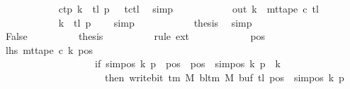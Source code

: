 \begin{isabellebody}
\ \ \ \ \ \ \ \ \ \ \isamarkupfalse%
\ c{}{\isacharunderscore}{\kern0pt}tp\ {\isacartoucheopen}k\ {\isacharequal}{\kern0pt}\ {\isacharquery}{\kern0pt}tl{\isacartoucheclose}\ {\isacartoucheopen}{\isacharquery}{\kern0pt}p\ {\isacharequal}{\kern0pt}\ {}{\isacartoucheclose}\ tc{\isacharunderscore}{\kern0pt}tl\ \isamarkupfalse%
\ simp\isanewline
\ \ \ \ \ \ \ \ \isamarkupfalse%
\ \isamarkupfalse%
\ {\isachardoublequoteopen}{\isacharquery}{\kern0pt}out\ k\ {\isacharequal}{\kern0pt}\ mt{\isacharunderscore}{\kern0pt}tape\ c{}\ {\isacharquery}{\kern0pt}tl{\isachardoublequoteclose}\isanewline
\ \ \ \ \ \ \ \ \ \ \isamarkupfalse%
\ {\isacartoucheopen}k\ {\isacharequal}{\kern0pt}\ {\isacharquery}{\kern0pt}tl{\isacartoucheclose}\ {\isacartoucheopen}{\isacharquery}{\kern0pt}p\ {\isacharequal}{\kern0pt}\ {}{\isacartoucheclose}\ \isamarkupfalse%
\ simp\isanewline
\ \ \ \ \ \ \ \ \isamarkupfalse%
\ \isamarkupfalse%
\ {\isacharquery}{\kern0pt}thesis\ \isamarkupfalse%
\ simp\isanewline
\ \ \ \ \ \ \isamarkupfalse%
\isanewline
\ \ \ \ \ \ \ \ \isamarkupfalse%
\ False\isanewline
\ \ \ \ \ \ \ \ \isamarkupfalse%
\ {\isacharquery}{\kern0pt}thesis\isanewline
\ \ \ \ \ \ \ \ \isamarkupfalse%
\ {\isacharparenleft}{\kern0pt}rule\ ext{\isacharparenright}{\kern0pt}\isanewline
\ \ \ \ \ \ \ \ \ \ \isamarkupfalse%
\ pos\isanewline
\ \ \ \ \ \ \ \ \ \ \isamarkupfalse%
\ lhs{\isacharcolon}{\kern0pt}\ {\isachardoublequoteopen}mt{\isacharunderscore}{\kern0pt}tape\ c{}\ k\ pos\isanewline
\ \ \ \ \ \ \ \ \ \ \ \ \ \ \ \ \ \ {\isacharequal}{\kern0pt}\ {\isacharparenleft}{\kern0pt}if\ sim{\isacharunderscore}{\kern0pt}pos\ {\isacharquery}{\kern0pt}k\ {\isacharquery}{\kern0pt}p\ {\isasymle}\ pos\ {\isasymand}\ pos\ {\isacharless}{\kern0pt}\ sim{\isacharunderscore}{\kern0pt}pos\ {\isacharquery}{\kern0pt}k\ {\isacharquery}{\kern0pt}p\ {\isacharplus}{\kern0pt}\ {\isacharquery}{\kern0pt}k\isanewline
\ \ \ \ \ \ \ \ \ \ \ \ \ \ \ \ \ \ \ \ \ then\ write{\isacharunderscore}{\kern0pt}bit\ {\isacharparenleft}{\kern0pt}{\isasymGamma}{\isacharunderscore}{\kern0pt}tm\ M{\isacharparenright}{\kern0pt}\ {\isacharparenleft}{\kern0pt}bl{\isacharunderscore}{\kern0pt}tm\ M{\isacharparenright}{\kern0pt}\ {\isacharparenleft}{\kern0pt}buf\ {\isacharquery}{\kern0pt}tl{\isacharparenright}{\kern0pt}\ {\isacharparenleft}{\kern0pt}pos\ {\isacharminus}{\kern0pt}\ sim{\isacharunderscore}{\kern0pt}pos\ {\isacharquery}{\kern0pt}k\ {\isacharquery}{\kern0pt}p{\isacharparenright}{\kern0pt}\isanewline

\end{isabellebody}
